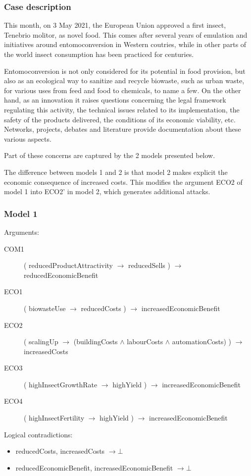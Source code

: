 \documentclass[version=3.21, pagesize, twoside=off, bibliography=totoc, DIV=calc, fontsize=12pt, a4paper, french, english]{scrartcl}
\begin{document}
\subsubsection{Case description}
This month, on 3 May 2021, the European Union approved a first insect, Tenebrio molitor, as novel food. This comes after several years of emulation and initiatives around entomoconversion in Western coutries, while in other parts of the world insect consumption has been practiced for centuries.

Entomoconversion is not only considered for its potential in food provision, but also as an ecological way to sanitize and recycle biowaste, such as urban waste, for various uses from feed and food to chemicals, to name a few. On the other hand, as an innovation it raises questions concerning the legal framework regulating this activity, the technical issues related to its implementation, the safety of the products delivered, the conditions of its economic viability, etc. Networks, projects, debates and literature provide documentation about these various aspects.

Part of these concerns are captured by the 2 models presented below.

The difference between models 1 and 2 is that model 2 makes explicit the economic consequence of increased costs. This modifies the argument ECO2 of model 1 into ECO2’ in model 2, which generates additional attacks.

\subsubsection{Model 1}
Arguments:
\begin{description}
	\item[COM1] ( reducedProductAttractivity $→$ reducedSells )  $→$  reducedEconomicBenefit
	\item[ECO1] ( biowasteUse $→$ reducedCosts )  $→$  increasedEconomicBenefit
	\item[ECO2] ( scalingUp $→$ (buildingCosts $\land$ labourCosts $\land$ automationCosts) )  $→$  increasedCosts
	\item[ECO3] ( highInsectGrowthRate $→$ highYield )  $→$  increasedEconomicBenefit
	\item[ECO4] ( highInsectFertility $→$ highYield )  $→$  increasedEconomicBenefit
\end{description}

Logical contradictions:
\begin{itemize}
	\item reducedCosts, increasedCosts $→ ⊥$
	\item reducedEconomicBenefit, increasedEconomicBenefit $→ ⊥$
\end{itemize}
\end{document}
